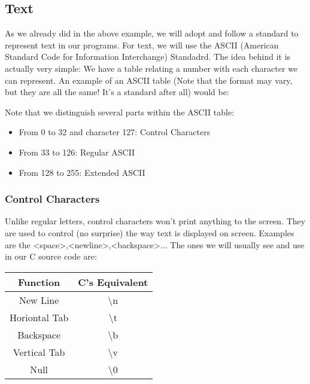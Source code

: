 \documentclass[12pt]{book}
\begin{document}
\subsection{Text}

As we already did in the above example, we will adopt and follow a standard to represent text in our programs. For text, we will use the ASCII (American Standard Code for Information Interchange) Standadrd. The idea behind it is actually very simple: We have a table relating a number with each character we can represent. An example of an ASCII table (Note that the format may vary, but they are all the same! It's a standard after all) would be:


Note that we distinguish several parts within the ASCII table:

\begin{itemize}
  \item From 0 to 32 and character 127: Control Characters
  \item From 33 to 126:  Regular ASCII
  \item From 128 to 255: Extended ASCII
\end{itemize}

\subsubsection{Control Characters}

Unlike regular letters, control characters won't print anything to the screen. They are used to control (no surprise) the way text is displayed on screen. Examples are the \textless space\textgreater,\textless newline\textgreater,\textless backspace\textgreater... The ones we will usually see and use in our C source code are:

\begin{center}
\begin{tabular}{|c|c|}
  \hline
  Function & C's Equivalent \\
  \hline
  New Line      & \textbackslash{}n \\
  Horiontal Tab & \textbackslash{}t \\
  Backspace     & \textbackslash{}b \\
  Vertical Tab  & \textbackslash{}v \\
  Null          & \textbackslash{}0 \\
  \hline
\end{tabular}
\end{center}
\end{document}
